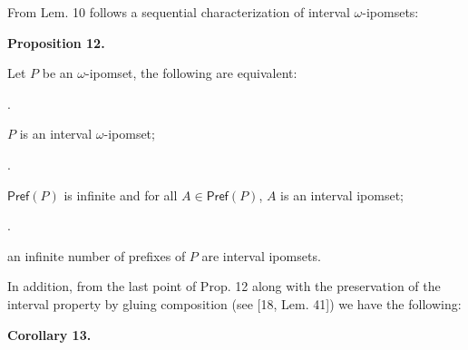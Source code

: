\documentclass[10pt,a4paper]{article}
\begin{document}
 
 
 
From Lem. 10 follows a sequential characterization of interval $\omega$-ipomsets:\par
 
 
 
\par\medskip\noindent\textbf{Proposition 12.}\par
 
 
Let $P$ be an $\omega$-ipomset, the following are equivalent:\par
  
\par{}. 
 
$P$ is an interval $\omega$-ipomset;\par
 
 
 
\par{}. 
 
$\mathsf{Pref}(P)$ is infinite and for all $A\in\mathsf{Pref}(P)$, $A$ is an interval ipomset;\par
 
 
 
\par{}. 
 
an infinite number of prefixes of $P$ are interval ipomsets.\par
 
 
  
 
 
 
In addition, from the last point of Prop. 12 along with the preservation of the interval property by gluing composition (see [18, Lem. 41]) we have the following:\par
 
 
 
\par\medskip\noindent\textbf{Corollary 13.}\par
 
\end{document}
